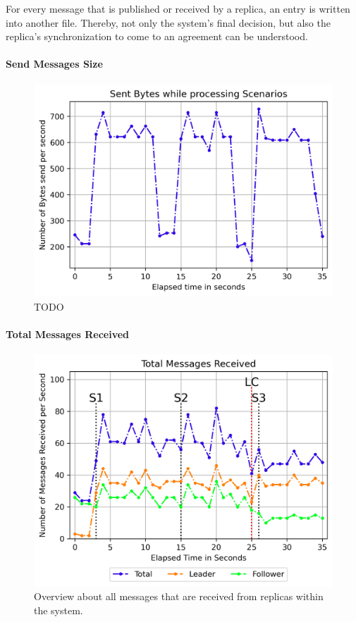 \iffalse


For every message that is published or received by a replica, an entry is written into another file.
Thereby, not only the system's final decision, but also the replica's synchronization to come to an agreement can be understood.

\paragraph{Send Messages Size}
\begin{figure}[!htb]
	\centering
	\includegraphics[width=0.75\linewidth]{images/plots/scenarioProcessingMessageSize}
	\caption{TODO}
	\label{fig:messageSizeScenarioProcessing}
\end{figure}


\paragraph{Total Messages Received}

\begin{figure}[!htb]
	\centering
	\includegraphics[width=0.75\linewidth]{images/plots/TotalMessagesReceive}
	\caption{Overview about all messages that are received from replicas within the system.}
	\label{fig:PlotTotalMessagesReceive}
\end{figure}

